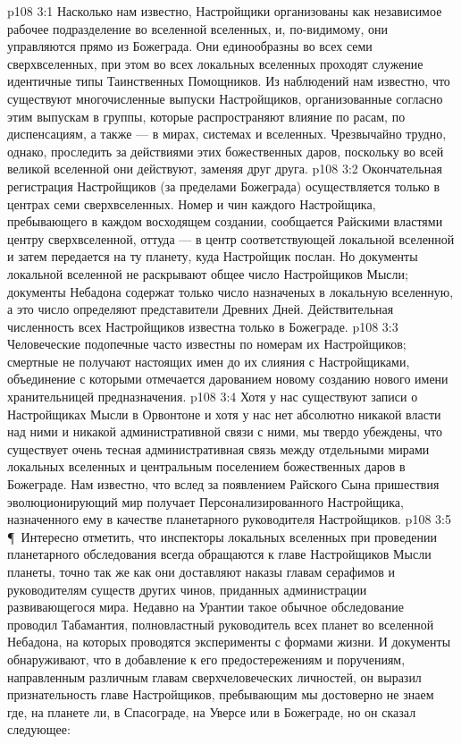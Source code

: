 \vs p108 3:1 Насколько нам известно, Настройщики организованы как независимое рабочее подразделение во вселенной вселенных, и, по\hyp{}видимому, они управляются прямо из Божеграда. Они единообразны во всех семи сверхвселенных, при этом во всех локальных вселенных проходят служение идентичные типы Таинственных Помощников. Из наблюдений нам известно, что существуют многочисленные выпуски Настройщиков, организованные согласно этим выпускам в группы, которые распространяют влияние по расам, по диспенсациям, а также --- в мирах, системах и вселенных. Чрезвычайно трудно, однако, проследить за действиями этих божественных даров, поскольку во всей великой вселенной они действуют, заменяя друг друга.
\vs p108 3:2 Окончательная регистрация Настройщиков (за пределами Божеграда) осуществляется только в центрах семи сверхвселенных. Номер и чин каждого Настройщика, пребывающего в каждом восходящем создании, сообщается Райскими властями центру сверхвселенной, оттуда --- в центр соответствующей локальной вселенной и затем передается на ту планету, куда Настройщик послан. Но документы локальной вселенной не раскрывают общее число Настройщиков Мысли; документы Небадона содержат только число назначеных в локальную вселенную, а это число определяют представители Древних Дней. Действительная численность всех Настройщиков известна только в Божеграде.
\vs p108 3:3 Человеческие подопечные часто известны по номерам их Настройщиков; смертные не получают настоящих имен до их слияния с Настройщиками, объединение с которыми отмечается дарованием новому созданию нового имени хранительницей предназначения.
\vs p108 3:4 Хотя у нас существуют записи о Настройщиках Мысли в Орвонтоне и хотя у нас нет абсолютно никакой власти над ними и никакой административной связи с ними, мы твердо убеждены, что существует очень тесная административная связь между отдельными мирами локальных вселенных и центральным поселением божественных даров в Божеграде. Нам известно, что вслед за появлением Райского Сына пришествия эволюционирующий мир получает Персонализированного Настройщика, назначенного ему в качестве планетарного руководителя Настройщиков.
\vs p108 3:5 \P\ Интересно отметить, что инспекторы локальных вселенных при проведении планетарного обследования всегда обращаются к главе Настройщиков Мысли планеты, точно так же как они доставляют наказы главам серафимов и руководителям существ других чинов, приданных администрации развивающегося мира. Недавно на Урантии такое обычное обследование проводил Табамантия, полновластный руководитель всех планет во вселенной Небадона, на которых проводятся эксперименты с формами жизни. И документы обнаруживают, что в добавление к его предостережениям и поручениям, направленным различным главам сверхчеловеческих личностей, он выразил признательность главе Настройщиков, пребывающим мы достоверно не знаем где, на планете ли, в Спасограде, на Уверсе или в Божеграде, но он сказал следующее:
